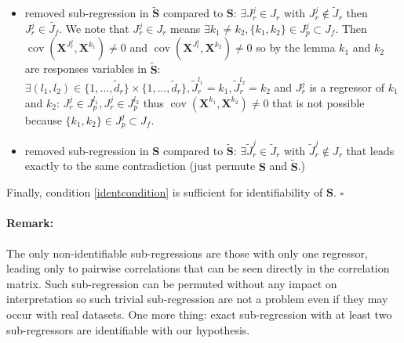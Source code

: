 \documentclass[12pt,a4paper]{report}
\begin{document}
\begin{itemize}
	\item removed sub-regression in $\tilde{\boldsymbol{S}}$ compared to $\boldsymbol{S}$: $\exists J_r^j \in J_r$ with $J_r^j \notin \tilde{J}_r$ then $J_r^j\in \tilde{J_f}$. We note that $J_r^j \in J_r$ means $\exists k_1\neq k_2, \{k_1,k_2 \}\in J_p^j \subset J_f$. Then $\operatorname{cov}(\boldsymbol{X}^{J_r^j},\boldsymbol{X}^{k_1})\neq 0$ and $\operatorname{cov}(\boldsymbol{X}^{J_r^j},\boldsymbol{X}^{k_2})\neq 0 $ so by the lemma $k_1$ and $k_2$ are responses variables in $\tilde{\boldsymbol{S}}$: $\exists (l_1,l_2) \in \{1,\dots,\tilde{d}_r \}\times \{1,\dots,\tilde{d}_r \}, \tilde{J}_r^{l_1}=k_1,\tilde{J}_r^{l_2}=k_2$ and $J_r^j$ is a regressor of $k_1$ and $k_2$: $J_r^j \in J_p^{l_1}, J_r^j \in J_p^{l_2}$ thus $\operatorname{cov}(\boldsymbol{X}^{k_1},\boldsymbol{X}^{k_2})\neq 0$ that is not possible because $ \{k_1,k_2 \}\in J_p^j \subset J_f$.
	\item removed sub-regression in $\boldsymbol{S}$ compared to $\tilde{\boldsymbol{S}}$: $\exists \tilde{J}_r^j \in \tilde{J}_r$ with $\tilde{J}_r^j \notin J_r$ that leads exactly to the same contradiction (just permute $\boldsymbol{S}$ and $\tilde{\boldsymbol{S}}$.)
\end{itemize}
Finally, condition \ref{identcondition} is sufficient for identifiability of $\boldsymbol{S}$.
  	$\square$		
	
\paragraph{Remark:} The only non-identifiable sub-regressions are those with only one regressor, leading only to pairwise correlations that can be seen directly in the correlation matrix. Such sub-regression can be permuted without any impact on interpretation so such trivial sub-regression are not a problem even if they may occur with real datasets. One more thing: exact sub-regression with at least two sub-regressors are identifiable with our hypothesis. 	
	
\end{document}
